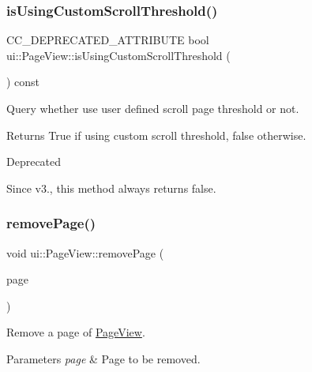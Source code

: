 \subsubsection{\texorpdfstring{is\+Using\+Custom\+Scroll\+Threshold()}{isUsingCustomScrollThreshold()}\hspace{0.1cm}{\footnotesize\ttfamily [2/2]}}
{\footnotesize\ttfamily C\+C\+\_\+\+D\+E\+P\+R\+E\+C\+A\+T\+E\+D\+\_\+\+A\+T\+T\+R\+I\+B\+U\+TE bool ui\+::\+Page\+View\+::is\+Using\+Custom\+Scroll\+Threshold (\begin{DoxyParamCaption}{ }\end{DoxyParamCaption}) const}



Query whether use user defined scroll page threshold or not. 

\begin{DoxyReturn}{Returns}
True if using custom scroll threshold, false otherwise. 
\end{DoxyReturn}
\begin{DoxyRefDesc}{Deprecated}
\item[\hyperlink{deprecated__deprecated000389}{Deprecated}]Since v3., this method always returns false. \end{DoxyRefDesc}
\mbox{\label{classui_1_1PageView_afc0653451f8a57c9cb2f7b14eabe1c1f}} 
\subsubsection{\texorpdfstring{remove\+Page()}{removePage()}\hspace{0.1cm}{\footnotesize\ttfamily [1/2]}}
{\footnotesize\ttfamily void ui\+::\+Page\+View\+::remove\+Page (\begin{DoxyParamCaption}\item[{\hyperlink{classui_1_1Widget}{Widget} $\ast$}]{page }\end{DoxyParamCaption})}

Remove a page of \hyperlink{classui_1_1PageView}{Page\+View}.


\begin{DoxyParams}{Parameters}
{\em page} & Page to be removed. \\
\hline
\end{DoxyParams}
\mbox{\label{classui_1_1PageView_afc0653451f8a57c9cb2f7b14eabe1c1f}} 
